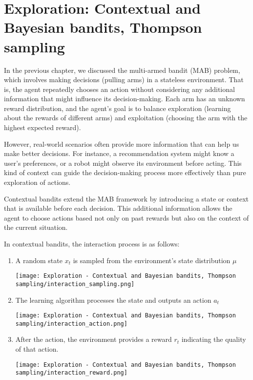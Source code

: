 \chapter{Exploration: Contextual and Bayesian bandits,  Thompson sampling}

In the previous chapter, we discussed the multi-armed bandit (MAB) problem, which involves making decisions (pulling arms) in a stateless environment. That is, the agent repeatedly chooses an action without considering any additional information that might influence its decision-making. Each arm has an unknown reward distribution, and the agent's goal is to balance exploration (learning about the rewards of different arms) and exploitation (choosing the arm with the highest expected reward).

However, real-world scenarios often provide more information that can help us make better decisions. For instance, a recommendation system might know a user's preferences, or a robot might observe its environment before acting. This kind of context can guide the decision-making process more effectively than pure exploration of actions.

Contextual bandits extend the MAB framework by introducing a state or context that is available before each decision. This additional information allows the agent to choose actions based not only on past rewards but also on the context of the current situation.

In contextual bandits, the interaction process is as follows:
\newpage
\begin{enumerate}
    \item A random state $x_t$ is sampled from the environment's state distribution $\mu$ \begin{center}\texttt{[image: Exploration - Contextual and Bayesian bandits, Thompson sampling/interaction\_sampling.png]} \end{center}
    \item The learning algorithm processes the state and outputs an action $a_t$ \begin{center}\texttt{[image: Exploration - Contextual and Bayesian bandits, Thompson sampling/interaction\_action.png]} \end{center}
    \item After the action, the environment provides a reward $r_t$ indicating the quality of that action. \begin{center}\texttt{[image: Exploration - Contextual and Bayesian bandits, Thompson sampling/interaction\_reward.png]} \end{center}
\end{enumerate}

